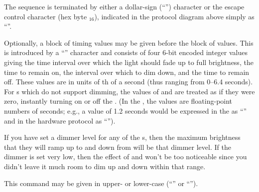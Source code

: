 The sequence is terminated by either a dollar-sign (``\z{\$}'') character or the
escape control character (hex byte $_{16}$), indicated in the protocol diagram above
simply as ``\z{\$}''.

Optionally, a block of timing values may be given before the block of  values.
This is introduced by a ``\z{/}'' character and consists of four 6-bit encoded integer values
giving the time interval over which the light should fade up to full brightness, the time to
remain on, the interval over which to dim down, and the time to remain off. These values
are in units of th of a second (thus ranging from 0--6.4 seconds). For \led s
which do not support dimming, the values of  and  are treated as if they
were zero, instantly turning on or off the \led. (In the  ,
the  values are floating-point numbers of seconds; e.g., a value of 1.2 seconds would be
expressed in the  as ``'' and in the hardware protocol as ``\z{<}'').

If you have set a dimmer level for any of the \led s, then the maximum brightness that they will
ramp up to and down from will be that dimmer level. If the dimmer is set very low, then the
effect of  and  won't be too noticeable since you didn't leave it much
room to dim up and down within that range.
			
This command may be given in upper- or lower-case (``'' or ``'').

